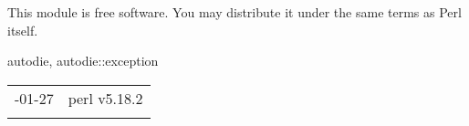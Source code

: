 \documentclass[]{article}
\begin{document}
This module is free software. You may distribute it under the same terms
as Perl itself.


autodie, autodie::exception

\begin{longtable}[c]{@{}ll@{}}
\toprule\addlinespace
2014-01-27 & perl v5.18.2
\\\addlinespace
\bottomrule
\end{longtable}
\end{document}
